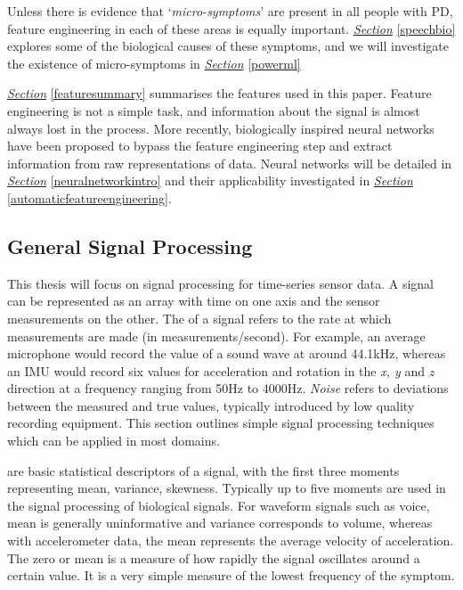 \documentclass[12pt, twoside]{book}
\renewcommand\emph[1]{\textit{\color{USred}{#1}}}
\begin{document}
Unless there is evidence that `\textit{micro-symptoms}' are present in all people with PD, feature engineering in each of these areas is equally important. \textit{\hyperref[speechbio]{Section}} \ref{speechbio} explores some of the biological causes of these symptoms, and we will investigate the existence of  micro-symptoms in \textit{\hyperref[powerml]{Section}} \ref{powerml}


\textit{\hyperref[featuresummary]{Section}} \ref{featuresummary} summarises the features used in this paper. Feature engineering is not a simple task, and information about the signal is almost always lost in the process. More recently, biologically inspired neural networks have been proposed to bypass the feature engineering step and extract information from raw representations of data. Neural networks will be detailed in \textit{\hyperref[neuralnetworkintro]{Section}} \ref{neuralnetworkintro} and their applicability investigated in \textit{\hyperref[automaticfeatureengineering]{Section}} \ref{automaticfeatureengineering}.

\subsection{General Signal Processing}
\label{generalsignalproc}
This thesis will focus on signal processing for time-series sensor data. A signal can be represented as an array with time on one axis and the sensor measurements on the other. The \emph{frequency} of a signal refers to the rate at which measurements are made (in measurements/second). For example, an average microphone would record the value of a sound wave at around 44.1kHz, whereas an IMU would record six values for acceleration and rotation in the \textit{x, y} and \textit{z} direction at a frequency ranging from 50Hz to 4000Hz. \textit{Noise} refers to deviations between the measured and true values, typically introduced by low quality recording equipment. This section outlines simple signal processing techniques which can be applied in most domains.


\emph{Moments} are basic statistical descriptors of a signal, with the first three moments representing mean, variance, skewness. Typically up to five moments are used in the signal processing of biological signals. For waveform signals such as voice, mean is generally uninformative and variance corresponds to volume, whereas with accelerometer data, the mean represents the average velocity of acceleration.  The zero or mean \emph{crossing rate} is a measure of how rapidly the signal oscillates around a certain value. It is a very simple measure of the lowest frequency of the symptom.
\end{document}
